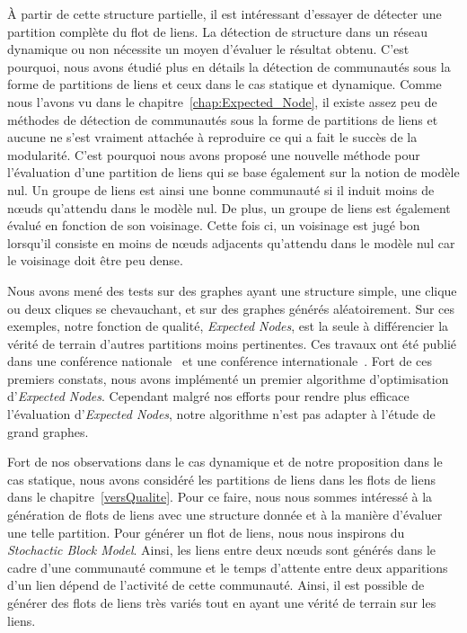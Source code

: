 \bigskip

\`A partir de cette structure partielle, il est intéressant d'essayer de détecter une partition complète du flot de liens.
La détection de structure dans un réseau dynamique ou non nécessite un moyen d'évaluer le résultat obtenu.
C'est pourquoi, nous avons étudié plus en détails la détection de communautés sous la forme de partitions de liens et ceux dans le cas statique et dynamique.
Comme nous l'avons vu dans le chapitre~\ref{chap:Expected_Node}, il existe assez peu de méthodes de détection de communautés sous la forme de partitions de liens et aucune ne s'est vraiment attachée à reproduire ce qui a fait le succès de la modularité.
C'est pourquoi nous avons proposé une nouvelle méthode pour l'évaluation d'une partition de liens qui se base également sur la notion de modèle nul.
Un groupe de liens est ainsi une bonne communauté si il induit moins de n\oe uds qu'attendu dans le modèle nul.
De plus, un groupe de liens est également évalué en fonction de son voisinage.
Cette fois ci, un voisinage est jugé bon lorsqu'il consiste en moins de n\oe uds adjacents qu'attendu dans le modèle nul car le voisinage doit être peu dense.

Nous avons mené des tests sur des graphes ayant une structure simple, une clique ou deux cliques se chevauchant, et sur des graphes générés aléatoirement.
Sur ces exemples, notre fonction de qualité, \emph{Expected Nodes}, est la seule à différencier la vérité de terrain d'autres partitions moins pertinentes.
Ces travaux ont été publié dans une conférence nationale~\cite{Gaumont2014} et une conférence internationale~\cite{Gaumont2015}.
Fort de ces premiers constats, nous avons implémenté un premier algorithme d'optimisation d'\emph{Expected Nodes}.
Cependant malgré nos efforts pour rendre plus efficace l'évaluation d'\emph{Expected Nodes}, notre algorithme n'est pas adapter à l'étude de grand graphes.

\bigskip

Fort de nos observations dans le cas dynamique et de notre proposition dans le cas statique, nous avons considéré les partitions de liens dans les flots de liens dans le chapitre~\ref{versQualite}.
Pour ce faire, nous nous sommes intéressé à la génération de flots de liens avec une structure donnée et à la manière d'évaluer une telle partition.
Pour générer un flot de liens, nous nous inspirons du \emph{Stochactic Block Model}.
Ainsi, les liens entre deux n\oe uds sont générés dans le cadre d'une communauté commune et le temps d'attente entre deux apparitions d'un lien dépend de l'activité de cette communauté.
Ainsi, il est possible de générer des flots de liens très variés tout en ayant une vérité de terrain sur les liens.

